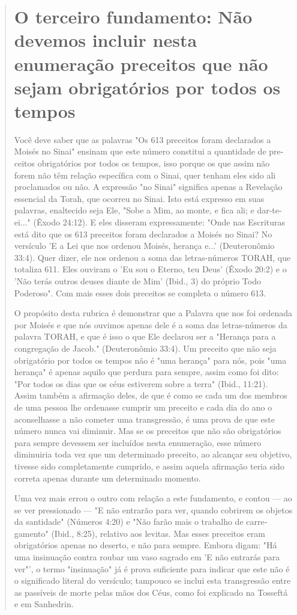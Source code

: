 \begin{quote}
\chapter{O terceiro fundamento: Não devemos incluir nesta enumeração preceitos que não sejam
obrigatórios por todos os tempos}

Você deve saber que as palavras "Os 613 preceitos foram declara­dos a
Moisés no Sinai" ensinam que este número constitui a quantidade de pre-
ceitos obrigatórios por todos os tempos, isso porque os que assim não
forem não têm relação específica com o Sinai, quer tenham eles sido ali
proclamados ou não. A expressão "no Sinai" significa apenas a Revelação
essencial da Torah, que ocorreu no Sinai. Isto está expresso em suas
palavras, enaltecido seja Ele, "Sobe a Mim, ao monte, e fica ali; e
dar-te-ei..." (Êxodo 24:12). E eles disseram expressamente: "Onde nas
Escrituras está dito que os 613 preceitos foram de­clarados a Moisés no
Sinai? No versículo 'E a Lei que nos ordenou Moisés, heran­ça e...'
(Deuteronômio 33:4). Quer dizer, ele nos ordenou a soma das
letras-nú­meros TORAH, que totaliza 611. Eles ouviram o 'Eu sou o
Eterno, teu Deus' (Êxo­do 20:2) e o 'Não terás outros deuses diante de
Mim' (Ibid., 3) do próprio Todo Poderoso". Com mais esses dois preceitos
se completa o número 613.

O propósito desta rubrica é demonstrar que a Palavra que nos foi
ordenada por Moisés e que nós ouvimos apenas dele é a soma das
letras-núme­ros da palavra TORAH, e que é isso o que Ele declarou ser a
"Herança para a congregação de Jacob." (Deuteronômio 33:4). Um preceito
que não seja obri­gatório por todos os tempos não é "uma herança" para
nós, pois "uma heran­ça" é apenas aquilo que perdura para sempre, assim
como foi dito: "Por todos os dias que os céus estiverem sobre a terra"
(Ibid., 11:21). Assim também a afir­mação deles, de que é como se cada
um dos membros de uma pessoa lhe orde­nasse cumprir um preceito e cada
dia do ano o aconselhasse a não cometer uma transgressão, é uma prova de
que este número nunca vai diminuir. Mas se os preceitos que não são
obrigatórios para sempre devessem ser incluídos nesta enumeração, esse
número diminuiria toda vez que um determinado preceito, ao alcançar seu
objetivo, tivesse sido completamente cumprido, e assim aquela afirmação
teria sido correta apenas durante um determinado momento.

Uma vez mais errou o outro com relação a este fundamento, e con­tou ---
ao se ver pressionado --- "E não entrarão para ver, quando cobrirem os
objetos da santidade" (Números 4:20) e "Não farão mais o trabalho de
carre­gamento" (Ibid., 8:25), relativo aos levitas. Mas esses preceitos
eram obrigató­rios apenas no deserto, e não para sempre. Embora digam:
"Há uma insinuação contra roubar um vaso sagrado em 'E não entrarás para
ver"', o termo "insi­nuação" já é prova suficiente para indicar que este
não é o significado literal do versículo; tampouco se inclui esta
transgressão entre as passíveis de morte pelas mãos dos Céus, como foi
explicado na Tosseftá e em Sanhedrin.


\end{quote}
